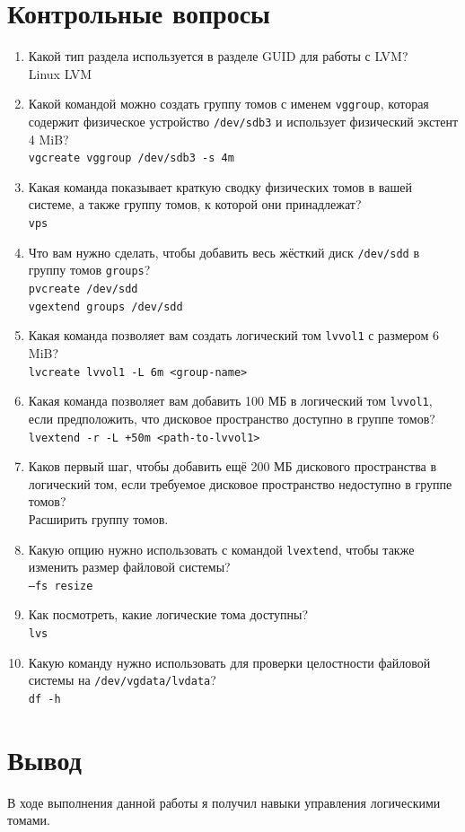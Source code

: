 \documentclass[12pt]{article}
\begin{document}
\section{Контрольные вопросы}
\begin{enumerate}
	\item Какой тип раздела используется в разделе GUID для работы с LVM? \\
	      Linux LVM
	\item Какой командой можно создать группу томов с именем \texttt{vggroup}, которая содержит
	      физическое устройство \texttt{/dev/sdb3} и использует физический экстент 4 MiB? \\
	      \texttt{vgcreate vggroup /dev/sdb3 -s 4m}
	\item Какая команда показывает краткую сводку физических томов в вашей системе,
	      а также группу томов, к которой они принадлежат? \\
	      \texttt{vps}
	\item Что вам нужно сделать, чтобы добавить весь жёсткий диск \texttt{/dev/sdd} в группу
	      томов \texttt{groups}? \\
	      \texttt{pvcreate /dev/sdd} \\
	      \texttt{vgextend groups /dev/sdd}
	\item Какая команда позволяет вам создать логический том \texttt{lvvol1} с размером 6 MiB? \\
	      \texttt{lvcreate lvvol1 -L 6m <group-name>}
	\item Какая команда позволяет вам добавить 100 МБ в логический том \texttt{lvvol1}, если
	      предположить, что дисковое пространство доступно в группе томов?
	      \texttt{lvextend -r -L +50m <path-to-lvvol1>}
	\item Каков первый шаг, чтобы добавить ещё 200 МБ дискового пространства в
	      логический том, если требуемое дисковое пространство недоступно в группе томов? \\
	      Расширить группу томов.
	\item Какую опцию нужно использовать с командой \texttt{lvextend}, чтобы также изменить
	      размер файловой системы? \\
	      \texttt{--fs resize}
	\item Как посмотреть, какие логические тома доступны? \\
	      \texttt{lvs}
	\item Какую команду нужно использовать для проверки целостности файловой системы
	      на \texttt{/dev/vgdata/lvdata}? \\
	      \texttt{df -h}
\end{enumerate}

\section{Вывод}
В ходе выполнения данной работы я получил навыки управления логическими томами.
\end{document}
